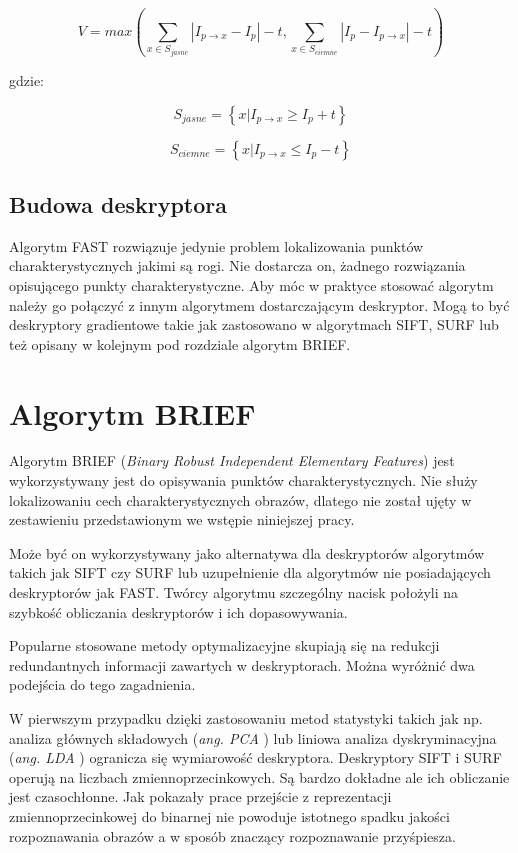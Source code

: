 \begin{equation}
V = max \left( \sum_{x\in S_{jasne}} |I_{p \rightarrow x}-I_p| - t , \sum_{x\in S_{ciemne}} |I_p-I_{p \rightarrow x}| - t  \right)
\end{equation}

gdzie:

\begin{equation}
S_{jasne} = \left\lbrace x|I_{p\rightarrow x} \geq I_{p} + t \right\rbrace
\end{equation}

\begin{equation}
S_{ciemne} = \left\lbrace x|I_{p\rightarrow x} \leq I_{p} - t \right\rbrace
\end{equation}

\subsection{Budowa deskryptora}
Algorytm FAST rozwiązuje jedynie problem lokalizowania punktów charakterystycznych jakimi są rogi. Nie dostarcza on, żadnego rozwiązania opisującego punkty charakterystyczne. Aby móc w praktyce stosować algorytm należy go połączyć z innym algorytmem dostarczającym deskryptor. Mogą to być deskryptory gradientowe takie jak zastosowano w algorytmach SIFT, SURF lub też opisany w kolejnym pod rozdziale algorytm BRIEF.
\FloatBarrier
\newpage
\section{Algorytm BRIEF}
Algorytm BRIEF (\textit{Binary Robust Independent Elementary Features}) \cite{B1} \cite{B2} jest wykorzystywany jest do opisywania punktów charakterystycznych. Nie służy lokalizowaniu cech charakterystycznych obrazów, dlatego nie został ujęty w zestawieniu przedstawionym we wstępie niniejszej pracy.

Może być on wykorzystywany jako alternatywa dla deskryptorów algorytmów takich jak SIFT czy SURF lub uzupełnienie dla algorytmów nie posiadających deskryptorów jak FAST. Twórcy algorytmu szczególny nacisk położyli na szybkość obliczania deskryptorów i ich dopasowywania. 


Popularne stosowane metody optymalizacyjne skupiają się na redukcji redundantnych informacji zawartych w deskryptorach. Można wyróżnić dwa podejścia do tego zagadnienia.

W pierwszym przypadku dzięki zastosowaniu metod statystyki takich jak np. analiza głównych składowych (\textit{ang. PCA} \cite{PCA}) lub liniowa analiza dyskryminacyjna (\textit{ang. LDA} \cite{LDA}) ogranicza się wymiarowość deskryptora. Deskryptory SIFT i SURF operują na liczbach zmiennoprzecinkowych. Są bardzo dokładne ale ich obliczanie jest czasochłonne. Jak pokazały prace \cite{B-ref1}\cite{B-ref2} \cite{B-ref3} przejście z reprezentacji zmiennoprzecinkowej do binarnej nie powoduje istotnego spadku jakości rozpoznawania obrazów a w sposób znaczący rozpoznawanie przyśpiesza. 


